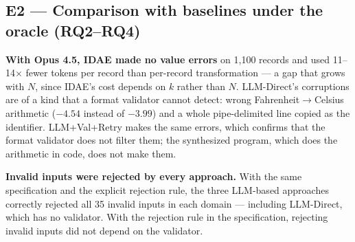 \documentclass[sigconf,nonacm]{acmart}
\begin{document}
\subsection{E2 --- Comparison with baselines under the oracle (RQ2--RQ4)}

\begin{table}[h]
\caption{E2 --- Opus 4.5. IDAE and Schema-Based on the full stream ($n=550$); LLM-Direct and LLM+Val+Retry on the subsample ($n=150$). Maximum attainable ``Correct'': 90.9\% (stream) and 76.7\% (subsample).}
\label{tab:e2}
\end{table}

\textbf{With Opus 4.5, IDAE made no value errors} on 1,100 records and used 11--14$\times$ fewer tokens per record than per-record transformation --- a gap that grows with $N$, since IDAE's cost depends on $k$ rather than $N$. LLM-Direct's corruptions are of a kind that a format validator cannot detect: wrong Fahrenheit$\to$Celsius arithmetic ($-4.54$ instead of $-3.99$) and a whole pipe-delimited line copied as the identifier. LLM+Val+Retry makes the same errors, which confirms that the format validator does not filter them; the synthesized program, which does the arithmetic in code, does not make them.

\textbf{Invalid inputs were rejected by every approach.} With the same specification and the explicit rejection rule, the three LLM-based approaches correctly rejected all 35 invalid inputs in each domain --- including LLM-Direct, which has no validator. With the rejection rule in the specification, rejecting invalid inputs did not depend on the validator.
\end{document}
